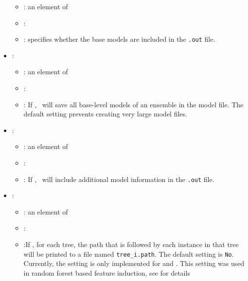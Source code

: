 \begin{itemize}
           \begin{itemize}
                \item \optionPossibleValues{}: an element of  
                \item \optionDefaultValue{}: 
                \item \optionDescrption{}: specifies whether the base models are included in the \texttt{.out} file.
           \end{itemize}
    \item {}:
           \begin{itemize}
                \item \optionPossibleValues{}: an element of 
                \item \optionDefaultValue{}: 
                \item \optionDescrption{}: If , \clus\ will save all base-level models of an ensemble in the model file. The default setting prevents creating very large model files.
           \end{itemize}
    \item {}:
           \begin{itemize}
                \item \optionPossibleValues{}: an element of 
                \item \optionDefaultValue{}: 
                \item \optionDescrption{}: If , \clus\ will include additional model information in the \texttt{.out} file.
           \end{itemize}
    \item {}:
           \begin{itemize}
                \item \optionPossibleValues{}: an element of 
                \item \optionDefaultValue{}: 
                \item \optionDescrption{}:If , for each tree, the path that is followed by each instance in that tree will be printed to a file named {\tt tree\_i.path}.  The default setting is \texttt{No}. Currently, the setting is only implemented for  and . This setting was used in random forest based feature induction, see \cite{Vens2011} for details

\end{itemize}
\end{itemize}
